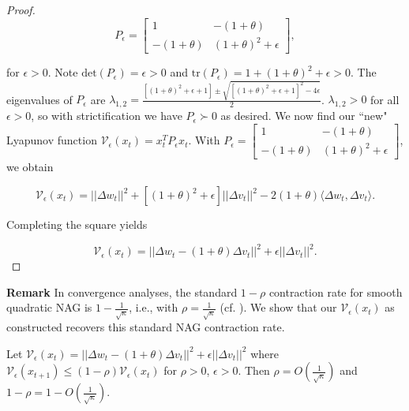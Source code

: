 \documentclass[twoside,11pt]{article}
\begin{document}
\begin{proof}
\begin{equation}
P_{\epsilon} = \begin{bmatrix}
    1 & -(1+\theta) \\
    -(1+\theta) & (1+\theta)^2+\epsilon
\end{bmatrix},
\end{equation}

\noindent
for $\epsilon > 0$. Note $\text{det}(P_{\epsilon}) = \epsilon > 0$ and $\text{tr}(P_{\epsilon}) = 1 + (1+\theta)^2+\epsilon > 0$. The eigenvalues of $P_{\epsilon}$ are $\lambda_{1,2} = \frac{[(1+\theta)^2+\epsilon+1]\pm \sqrt{[(1+\theta)^2+\epsilon+1]^2-4\epsilon}}{2}$. $\lambda_{1,2} > 0$ for all $\epsilon > 0$, so with strictification we have $P_{\epsilon} \succ 0$ as desired. We now find our ``new" Lyapunov function $\mathcal{V}_{\epsilon}(x_t) = x_{t}^TP_{\epsilon}x_t$. With $P_{\epsilon} = \begin{bmatrix}
    1 & -(1+\theta) \\
    -(1+\theta) & (1+\theta)^2+\epsilon
\end{bmatrix}$, we obtain

\begin{equation}
\mathcal{V}_{\epsilon}(x_t) = ||\Delta w_t||^2 + [(1+\theta)^2+\epsilon]||\Delta v_t||^2 - 2(1+\theta)\langle \Delta w_t, \Delta v_t \rangle.
\end{equation}

\noindent
Completing the square yields

\begin{equation}
\mathcal{V}_{\epsilon}(x_t) = ||\Delta w_t - (1+\theta)\Delta v_t||^2 + \epsilon||\Delta v_t||^2.   
\end{equation}
\end{proof}

\noindent
\textbf{Remark} In convergence analyses, the standard $1-\rho$ contraction rate for smooth quadratic NAG is $1 - \frac{1}{\sqrt{\kappa}}$, i.e., with $\rho = \frac{1}{\sqrt{\kappa}}$ (cf. \cite{LRP16}). We show that our $\mathcal{V}_{\epsilon}(x_t)$ as constructed recovers this standard NAG contraction rate.

\begin{theorem}
Let $\mathcal{V}_{\epsilon}(x_t) = ||\Delta w_t - (1+\theta)\Delta v_t||^2 + \epsilon||\Delta v_t||^2$ where $\mathcal{V}_{\epsilon}(x_{t+1}) \leq (1-\rho)\mathcal{V}_{\epsilon}(x_t)$ for $\rho > 0$, $\epsilon > 0$. Then $\rho = O(\frac{1}{\sqrt{\kappa}})$ and $1 - \rho = 1 - O(\frac{1}{\sqrt{\kappa}})$.
\end{theorem}
\end{document}
